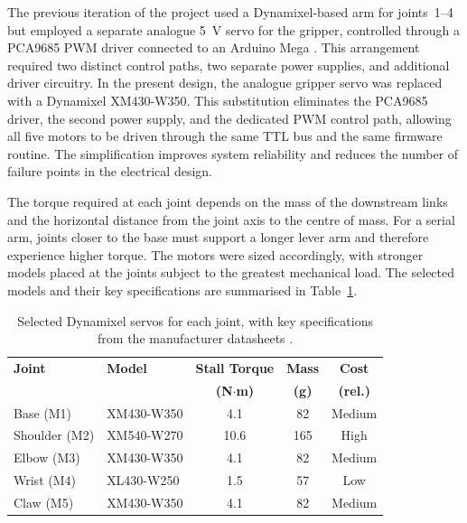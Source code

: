 The previous iteration of the project used a Dynamixel-based arm 
for joints~1--4 but employed a separate analogue 5~V servo for 
the gripper, controlled through a PCA9685 PWM driver connected to 
an Arduino Mega \cite{hivemind}. This arrangement required two 
distinct control paths, two separate power supplies, and 
additional driver circuitry. In the present design, the analogue 
gripper servo was replaced with a Dynamixel XM430-W350. This 
substitution eliminates the PCA9685 driver, the second power 
supply, and the dedicated PWM control path, allowing all five 
motors to be driven through the same TTL bus and the same firmware 
routine. The simplification improves system reliability and 
reduces the number of failure points in the electrical design.

The torque required at each joint depends on the mass of the 
downstream links and the horizontal distance from the joint axis 
to the centre of mass. For a serial arm, joints closer to the 
base must support a longer lever arm and therefore experience 
higher torque. The motors were sized accordingly, with stronger 
models placed at the joints subject to the greatest mechanical 
load. The selected models and their key specifications are 
summarised in Table~\ref{tab:motor_selection}.

\begin{table}[htbp]
    \centering
    \renewcommand{\arraystretch}{1.3}
    \begin{tabular}{|l|l|c|c|c|}
        \hline
        \textbf{Joint} & \textbf{Model} & 
        \textbf{Stall Torque} & 
        \textbf{Mass} &
        \textbf{Cost} \\
         & & \textbf{(N$\cdot$m)} & \textbf{(g)} & \textbf{(rel.)} \\
        \hline
        Base (M1)     & XM430-W350 & 4.1 & 82  & Medium \\
        \hline
        Shoulder (M2) & XM540-W270 & 10.6 & 165 & High \\
        \hline
        Elbow (M3)    & XM430-W350 & 4.1 & 82  & Medium \\
        \hline
        Wrist (M4)    & XL430-W250 & 1.5 & 57  & Low \\
        \hline
        Claw (M5)     & XM430-W350 & 4.1 & 82  & Medium \\
        \hline
    \end{tabular}
    \caption{Selected Dynamixel servos for each joint, with key 
    specifications from the manufacturer datasheets 
    \cite{robotis_dynamixel}.}
    \label{tab:motor_selection}
\end{table}

